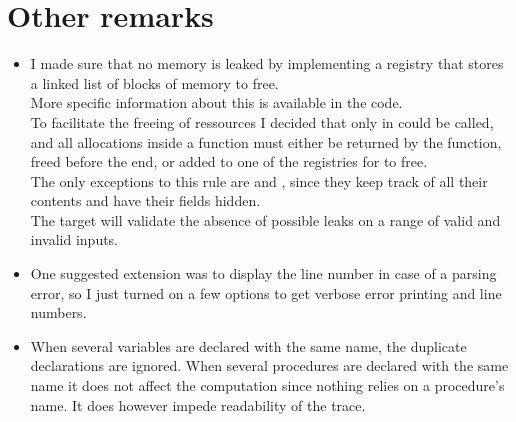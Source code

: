 \section{Other remarks}

\begin{itemize}
    \item I made sure that no memory is leaked by implementing a registry
        that stores a linked list of blocks of memory to free.\\
        More specific information about this is available in the code.\\

        To facilitate the freeing of ressources I decided that only in
         could  be called, and all allocations inside
        a function must either be returned by the function, freed before
        the end, or added to one of the registries for  to free.\\
        The only exceptions to this rule are  and ,
        since they keep track of all their contents and have their fields hidden.\\

        The  target will validate the absence of
        possible leaks on a range of valid and invalid inputs.\\

    \item One suggested extension was to display the line number in case
        of a parsing error, so I just turned on a few options to get
        verbose error printing and line numbers.\\

    \item When several variables are declared with the same name, the
        duplicate declarations are ignored. When several procedures are
        declared with the same name it does not affect the computation
        since nothing relies on a procedure's name. It does however impede
        readability of the trace.
\end{itemize}
